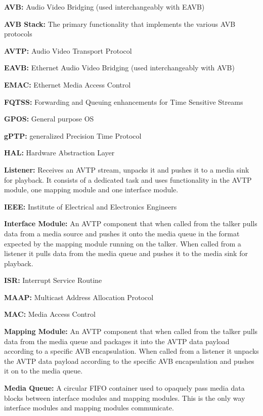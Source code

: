 {\bfseries A\+VB\+:} Audio Video Bridging (used interchangeably with E\+A\+VB)

{\bfseries A\+VB Stack\+:} The primary functionality that implements the various A\+VB protocols

{\bfseries A\+V\+TP\+:} Audio Video Transport Protocol

{\bfseries E\+A\+VB\+:} Ethernet Audio Video Bridging (used interchangeably with A\+VB)

{\bfseries E\+M\+AC\+:} Ethernet Media Access Control

{\bfseries F\+Q\+T\+SS\+:} Forwarding and Queuing enhancements for Time Sensitive Streams

{\bfseries G\+P\+OS\+:} General purpose OS

{\bfseries g\+P\+TP\+:} generalized Precision Time Protocol

{\bfseries H\+AL\+:} Hardware Abstraction Layer

{\bfseries Listener\+:} Receives an A\+V\+TP stream, unpacks it and pushes it to a media sink for playback. It consists of a dedicated task and uses functionality in the A\+V\+TP module, one mapping module and one interface module.

{\bfseries I\+E\+EE\+:} Institute of Electrical and Electronics Engineers

{\bfseries Interface Module\+:} An A\+V\+TP component that when called from the talker pulls data from a media source and pushes it onto the media queue in the format expected by the mapping module running on the talker. When called from a listener it pulls data from the media queue and pushes it to the media sink for playback.

{\bfseries I\+SR\+:} Interrupt Service Routine

{\bfseries M\+A\+AP\+:} Multicast Address Allocation Protocol

{\bfseries M\+AC\+:} Media Access Control

{\bfseries Mapping Module\+:} An A\+V\+TP component that when called from the talker pulls data from the media queue and packages it into the A\+V\+TP data payload according to a specific A\+VB encapsulation. When called from a listener it unpacks the A\+V\+TP data payload according to the specific A\+VB encapsulation and pushes it on to the media queue.

{\bfseries Media Queue\+:} A circular F\+I\+FO container used to opaquely pass media data blocks between interface modules and mapping modules. This is the only way interface modules and mapping modules communicate.


